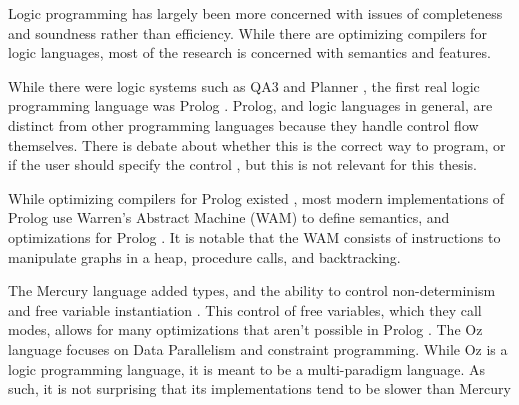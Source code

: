 
Logic programming has largely been more concerned with issues of completeness and soundness rather than efficiency.
While there are optimizing compilers for logic languages, most of the research is concerned with semantics and features.

While there were logic systems such as QA3 and Planner \cite{history_LP}, 
the first real logic programming language was Prolog \cite{prolog}.
Prolog, and logic languages in general, are distinct from other programming languages because they
handle control flow themselves.
There is debate about whether this is the correct way to program, or if the user should specify the control \cite{history_LP,planner},
but this is not relevant for this thesis.

While optimizing compilers for Prolog existed \cite{dec}, most modern implementations of Prolog 
use Warren's Abstract Machine (WAM) \cite{wam}
to define semantics, and optimizations for Prolog \cite{yap, sicstus}.
It is notable that the WAM consists of instructions to manipulate graphs in a heap, procedure calls, and backtracking.

The Mercury language added types, and the ability to control non-determinism and free variable instantiation \cite{mercury}.
This control of free variables, which they call modes, allows for many optimizations
that aren't possible in Prolog \cite{mercury}.
The Oz language focuses on Data Parallelism and constraint programming.
While Oz is a logic programming language, it is meant to be a multi-paradigm language.
As such, it is not surprising that its implementations tend to be slower than Mercury \cite{mercury, oz}

